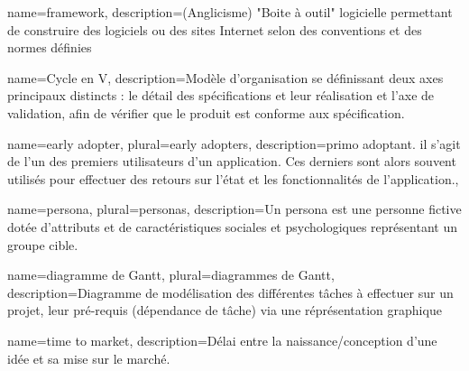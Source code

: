 
\begin{comment}
Glossaire : 
  Nouvelle entrée :
    \newglossaryentry{test} %
    {%
        name={test}, %
        description={<description>}, %
        plural={tests} %
    }
  Usage : 
    \gls{test} Retourne "test"
    \Gls{test} Retourne "Test"
    \glsplural{test} Retourne "tests"
    \Glsplural{test} Retourne "Tests"
        
Pour des mots utilisés fréquemment, petite astuce : 
	\newcommand{\bsr}{bilan scientifique régional} 
Ensuite, dans le contenu, il suffit d'y faire référence comme ceci : "\bsr{}"
\end{comment}


{%
    name={framework},
    description={(Anglicisme) "Boite à outil" logicielle permettant de construire des logiciels ou des sites Internet selon des conventions et des normes définies}
}

{%
	name={Cycle en V},
	description={Modèle d'organisation se définissant deux axes principaux distincts : le détail des spécifications et leur réalisation et l'axe de validation, afin de vérifier que le produit est conforme aux spécification.}
}

{%
	name={early adopter},
	plural={early adopters},
	description={primo adoptant. il s'agit de l'un des premiers utilisateurs d'un application. Ces derniers sont alors souvent utilisés pour effectuer des retours sur l'état et les fonctionnalités de l'application.},
}

{
	name={persona},
	plural={personas},
	description={Un persona est une personne fictive dotée d'attributs et de caractéristiques sociales et psychologiques représentant un groupe cible.}
}

{
	name={diagramme de Gantt},
	plural={diagrammes de Gantt},
	description={Diagramme de modélisation des différentes tâches à effectuer sur un projet, leur pré-requis (dépendance de tâche) via une réprésentation graphique}
}

{
	name={time to market},
	description={Délai entre la naissance/conception d'une idée et sa mise sur le marché.}
}


